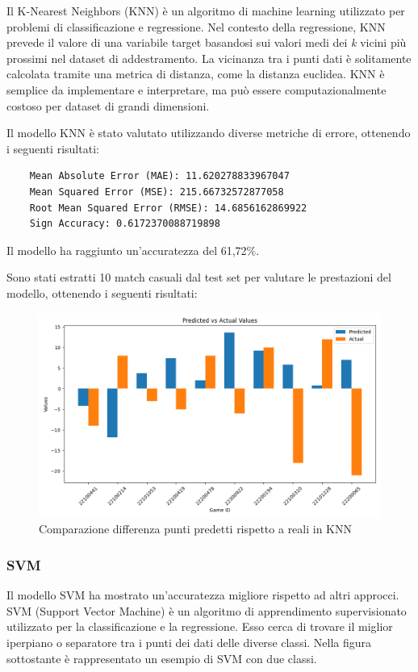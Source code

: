 Il K-Nearest Neighbors (KNN) è un algoritmo di machine learning utilizzato per problemi di classificazione e regressione. Nel contesto della regressione, KNN prevede il valore di una variabile target basandosi sui valori medi dei \textit{k} vicini più prossimi nel dataset di addestramento. La vicinanza tra i punti dati è solitamente calcolata tramite una metrica di distanza, come la distanza euclidea. KNN è semplice da implementare e interpretare, ma può essere computazionalmente costoso per dataset di grandi dimensioni.


Il modello KNN è stato valutato utilizzando diverse metriche di errore, ottenendo i seguenti risultati:
\begin{lstlisting}
    Mean Absolute Error (MAE): 11.620278833967047
    Mean Squared Error (MSE): 215.66732572877058
    Root Mean Squared Error (RMSE): 14.6856162869922
    Sign Accuracy: 0.6172370088719898
\end{lstlisting}
Il modello ha raggiunto un'accuratezza del 61,72\%.

Sono stati estratti 10 match casuali dal test set per valutare le prestazioni del modello, ottenendo i seguenti risultati:
\begin{figure}[H]
    \centering
    \includegraphics[width=0.7\linewidth]{img/knn_istogramma.png}
    \caption{Comparazione differenza punti predetti rispetto a reali in KNN}
    \label{fig:enter-label}
\end{figure}

\subsubsection{SVM}

Il modello SVM ha mostrato un'accuratezza migliore rispetto ad altri approcci. SVM (Support Vector Machine) è un algoritmo di apprendimento supervisionato utilizzato per la classificazione e la regressione. Esso cerca di trovare il miglior iperpiano o separatore tra i punti dei dati delle diverse classi. Nella figura sottostante è rappresentato un esempio di SVM con due classi.

